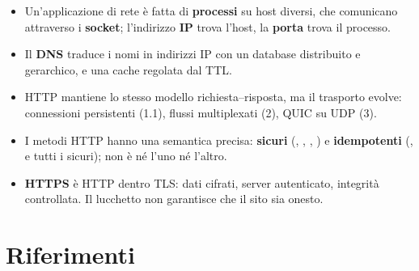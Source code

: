 \begin{itemize}
  \item Un'applicazione di rete è fatta di \textbf{processi} su host diversi, che
        comunicano attraverso i \textbf{socket}; l'indirizzo \textbf{IP} trova
        l'host, la \textbf{porta} trova il processo.
  \item Il \textbf{DNS} traduce i nomi in indirizzi IP con un database
        distribuito e gerarchico, e una cache regolata dal TTL.
  \item HTTP mantiene lo stesso modello richiesta--risposta, ma il trasporto
        evolve: connessioni persistenti (1.1), flussi multiplexati (2), QUIC su
        UDP (3).
  \item I metodi HTTP hanno una semantica precisa: \textbf{sicuri} (,
        , , ) e \textbf{idempotenti}
        (,  e tutti i sicuri);  non è né l'uno né
        l'altro.
  \item \textbf{HTTPS} è HTTP dentro TLS: dati cifrati, server autenticato,
        integrità controllata. Il lucchetto non garantisce che il sito sia onesto.
\end{itemize}

\section{Riferimenti}

